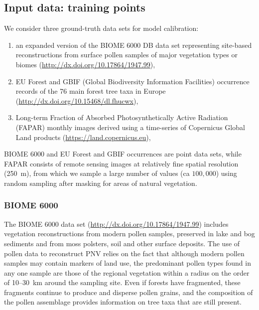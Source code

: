 \documentclass[fleqn,10pt,lineno]{wlpeerj} %
\begin{document}
\subsection*{Input data: training points}

We consider three ground-truth data sets for model calibration: 

\begin{enumerate}
\item an expanded version of the BIOME 6000 DB data set representing site-based reconstructions from surface pollen samples of major vegetation types or biomes (\url{http://dx.doi.org/10.17864/1947.99}),
\item EU Forest \citep{mauri2017eu} and GBIF (Global Biodiversity Information Facilities) occurrence records of the 76 main forest tree taxa in Europe (\url{http://dx.doi.org/10.15468/dl.fhucwx}),
\item Long-term Fraction of Absorbed Photosynthetically Active Radiation (FAPAR) monthly images derived using a time-series of Copernicus Global Land products (\url{https://land.copernicus.eu}),
\end{enumerate}

BIOME 6000 and EU Forest and GBIF occurrences are point data sets, while FAPAR consists of remote sensing images at relatively fine spatial resolution (\SI{250}{\meter}), from which we sample a large number of values (ca $100,000$) using random sampling after masking for areas of natural vegetation.\par

\subsubsection*{BIOME 6000}

The BIOME 6000 data set (\url{http://dx.doi.org/10.17864/1947.99}) includes vegetation reconstructions from modern pollen samples, preserved in lake and bog sediments and from moss polsters, soil and other surface deposits. The use of pollen data to reconstruct PNV relies on the fact that although modern pollen samples may contain markers of land use, the predominant pollen types found in any one sample are those of the regional vegetation within a radius on the order of 10--\SI{30}{\kilo\metre} around the sampling site. Even if forests have fragmented, these fragments continue to produce and disperse pollen grains, and the composition of the pollen assemblage provides information on tree taxa that are still present.\par 
\end{document}
